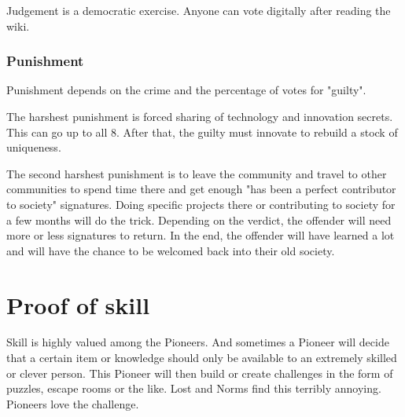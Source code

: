 Judgement is a democratic exercise. Anyone can vote digitally after reading the wiki.

\subsubsection{Punishment}

Punishment depends on the crime and the percentage of votes for "guilty".

The harshest punishment is forced sharing of technology and innovation secrets. This can go up to all 8. After that, the guilty must innovate to rebuild a stock of uniqueness.

The second harshest punishment is to leave the community and travel to other communities to spend time there and get enough "has been a perfect contributor to society" signatures. Doing specific projects there or contributing to society for a few months will do the trick. Depending on the verdict, the offender will need more or less signatures to return. In the end, the offender will have learned a lot and will have the chance to be welcomed back into their old society.

\section{Proof of skill}

Skill is highly valued among the Pioneers. And sometimes a Pioneer will decide that a certain item or knowledge should only be available to an extremely skilled or clever person.
This Pioneer will then build or create challenges in the form of puzzles, escape rooms or the like.
Lost and Norms find this terribly annoying.
Pioneers love the challenge.

